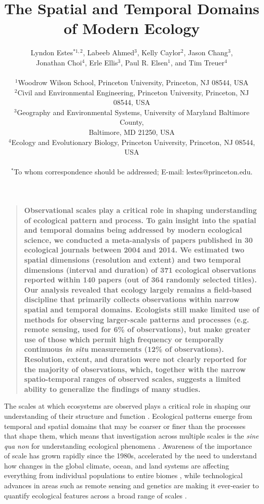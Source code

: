\documentclass[12pt]{article}
\title{The Spatial and Temporal Domains of Modern Ecology }%
\author
{Lyndon Estes$^{\ast1, 2}$, Labeeb Ahmed$^{3}$, Kelly Caylor$^{2}$, Jason Chang$^{3}$, \\
Jonathan Choi$^{4}$, Erle Ellis$^{3}$, Paul R. Elsen$^{1}$, and Tim Treuer$^{4}$ \\
\\
\normalsize{$^{1}$Woodrow Wilson School, Princeton University, Princeton, NJ 08544, USA}\\
\normalsize{$^{2}$Civil and Environmental Engineering, Princeton University, Princeton, NJ 08544, USA}\\
\normalsize{$^{3}$Geography and Environmental Systems, University of Maryland Baltimore County,}\\
\normalsize{Baltimore, MD 21250, USA}\\
\normalsize{$^{4}$Ecology and Evolutionary Biology, Princeton University, Princeton, NJ 08544, USA}\\
\\
\normalsize{$^\ast$To whom correspondence should be addressed; E-mail:  lestes@princeton.edu.}
}
\date{}
\newenvironment{sciabstract}{%
\begin{quote} \bf}
{\end{quote}}
\begin{document}
 


\baselineskip24pt


\maketitle 




\begin{sciabstract}
Observational scales play a critical role in shaping understanding of ecological pattern and process. To gain insight into the spatial and temporal domains being addressed by modern ecological science, we conducted a meta-analysis of papers published in 30 ecological journals between 2004 and 2014. We estimated two spatial dimensions (resolution and extent) and two temporal dimensions (interval and duration) of 371 ecological observations reported within 140 papers (out of 364 randomly selected titles). Our analysis revealed that ecology largely remains a field-based discipline that primarily collects observations within narrow spatial and temporal domains. Ecologists still make limited use of methods for observing larger-scale patterns and processes (e.g. remote sensing, used for 6\% of observations), but make greater use of those which permit high frequency or temporally continuous \emph{in situ} measurements (12\% of observations). Resolution, extent, and duration were not clearly reported for the majority of observations, which, together with the narrow spatio-temporal ranges of observed scales, suggests a limited ability to generalize the findings of many studies.    

\end{sciabstract}

\linenumbers
The scales at which ecosystems are observed plays a critical role in shaping our understanding of their structure and function \cite{levin_problem_1992,chave_problem_2013,wiens_spatial_1989-1}.  Ecological patterns emerge from temporal and spatial domains that may be coarser or finer than the processes that shape them, which means that investigation across multiple scales is the \emph{sine qua non} for understanding ecological phenomena \cite{levin_problem_1992}. Awareness of the importance of scale has grown rapidly since the 1980s, accelerated by the need to understand how changes in the global climate, ocean, and land systems are affecting everything from individual populations \cite{tingley_push_2012} to entire biomes \cite{xiao_photosynthetic_2004}, while technological advances in areas such as remote sensing and genetics are making it ever-easier to quantify ecological features across a broad range of scales \cite{schneider_rise_2001,chave_problem_2013}.  
\end{document}
